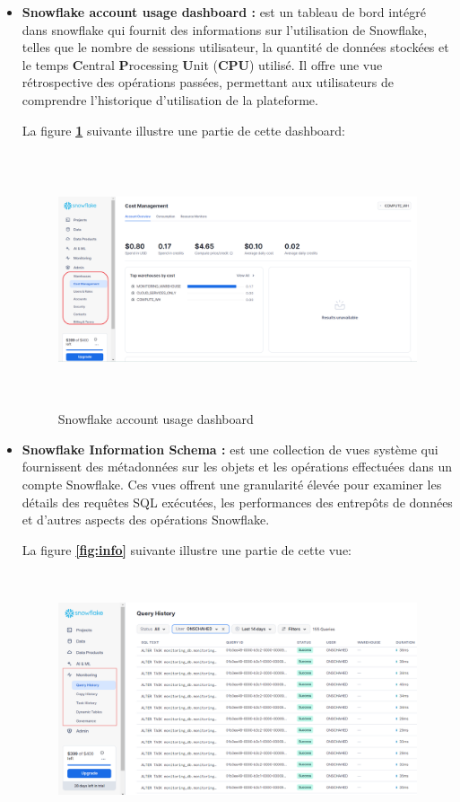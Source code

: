 \begin{itemize}
    \item\textbf{Snowflake account usage dashboard :}  est un tableau de bord intégré dans snowflake qui fournit des informations sur l'utilisation de Snowflake, telles que le nombre de sessions utilisateur, 
    la quantité de données stockées et le temps \textbf{C}entral \textbf{P}rocessing \textbf{U}nit (\textbf{CPU}) utilisé.
    Il offre une vue rétrospective des opérations passées, permettant aux utilisateurs de comprendre l'historique d'utilisation de la plateforme. 
    \par La figure \textbf{\ref{fig:SAU}} suivante illustre une partie de cette dashboard:
            \begin{figure}[H]
            \centering
            \includegraphics[width =13cm, height=7.5cm]{img/captures/account_usage}
            \caption{Snowflake account usage dashboard}
            \label{fig:SAU}
            \end{figure}
    \item\textbf{Snowflake Information Schema :} est une collection de vues système qui fournissent des métadonnées sur les objets et les opérations effectuées dans un compte Snowflake. 
    Ces vues offrent une granularité élevée pour examiner les détails des requêtes SQL exécutées, les performances des entrepôts de données et d'autres aspects des opérations Snowflake. 
    \par La figure \textbf{\ref{fig:info}} suivante illustre une partie de cette vue:
            \begin{figure}[H]
            \centering
            \includegraphics[width =13cm, height=7.5cm]{img/captures/info}

\end{figure}
\end{itemize}
